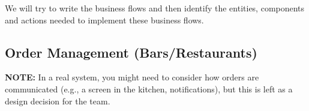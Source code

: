 \documentclass[]{VUMIFTemplateClass}
\newcommand{\noticecomment}[1]{%
    \begin{tcolorbox}[colback=blue!20, colframe=blue!60, arc=0pt, outer arc=0pt, boxrule=1pt, left=3pt, right=3pt, top=3pt, bottom=3pt]
        \textbf{\textcolor{blue!70!black}{NOTE:}} #1
    \end{tcolorbox}
}
\begin{document}
We will try to write the business flows and then identify the entities,
components and actions needed to implement these business flows.








\subsection{Order Management (Bars/Restaurants)}

\noticecomment{In a real system, you might need to consider how orders are communicated (e.g., a screen in the kitchen, notifications), but this is left as a design decision for the team.}
\end{document}
